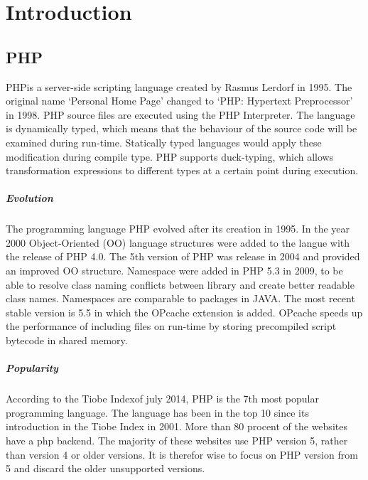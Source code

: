 \documentclass[../main.tex]{subfiles}
\begin{document}
    \chapter{Introduction}\label{chap:introduction}

    \section{PHP} %
        PHP\footnotemark is a server-side scripting language created by Rasmus Lerdorf in 1995.
        The original name `Personal Home Page' changed to `PHP: Hypertext Preprocessor' in 1998.
        PHP source files are executed using the PHP Interpreter. 
        The language is dynamically typed, which means that the behaviour of the source code will be examined during run-time.
        Statically typed languages would apply these modification during compile type.
        PHP supports duck-typing, which allows transformation expressions to different types at a certain point during execution.
        
        \paragraph{Evolution}
        The programming language PHP evolved after its creation in 1995.
        In the year 2000 Object-Oriented (OO) language structures were added to the langue with the release of PHP 4.0.
        The 5th version of PHP was release in 2004 and provided an improved OO structure.
        Namespace were added in PHP 5.3 in 2009, to be able to resolve class naming conflicts between library and create better readable class names.
        Namespaces are comparable to packages in JAVA.
        The most recent stable version is 5.5 in which the OPcache extension is added. 
        OPcache speeds up the performance of including files on run-time by storing precompiled script bytecode in shared memory.
       
        \paragraph{Popularity}
        According to the Tiobe Index\footnotemark of july 2014, PHP is the 7th most popular programming language.
        The language has been in the top 10 since its introduction in the Tiobe Index in 2001.
        More than 80 procent of the websites have a php backend\footnotemark.
        The majority of these websites use PHP version 5, rather than version 4 or older versions.
        It is therefor wise to focus on PHP version from 5 and discard the older unsupported versions.
            
\end{document}
